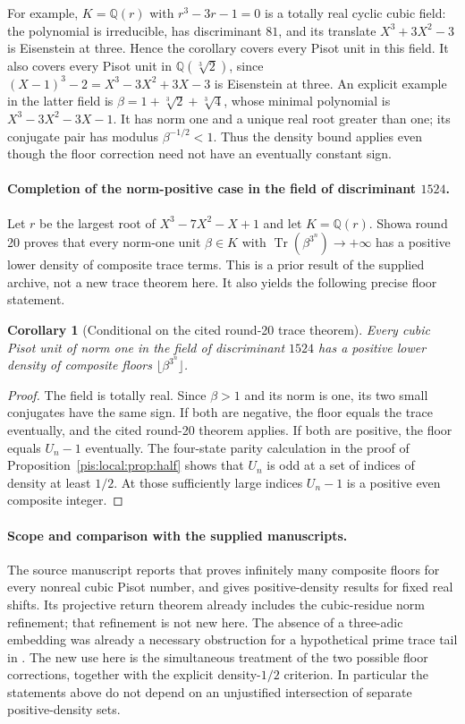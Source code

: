 \documentclass[11pt,a4paper]{article}
\newtheorem{corollary}[theorem]{Corollary}
\theoremstyle{definition}\newtheorem{definition}[theorem]{Definition}
\theoremstyle{remark}\newtheorem{remark}[theorem]{Remark}
\begin{document}
For example, $K=\mathbb Q(r)$ with $r^3-3r-1=0$ is a totally
real cyclic cubic field: the polynomial is irreducible, has
discriminant $81$, and its translate
$X^3+3X^2-3$ is Eisenstein at three. Hence the corollary covers
every Pisot unit in this field. It also covers every Pisot unit in
$\mathbb Q(\sqrt[3]{2})$, since
$(X-1)^3-2=X^3-3X^2+3X-3$ is Eisenstein at three.
An explicit example in the latter field is
$\beta=1+\sqrt[3]{2}+\sqrt[3]{4}$, whose minimal polynomial is
$X^3-3X^2-3X-1$. It has norm one and a unique real root greater
than one; its conjugate pair has modulus $\beta^{-1/2}<1$.
Thus the density bound applies even though the floor correction
need not have an eventually constant sign.

\paragraph{Completion of the norm-positive case in the field of
discriminant $1524$.}
Let $r$ be the largest root of $X^3-7X^2-X+1$ and let
$K=\mathbb Q(r)$. Showa round 20 proves that every norm-one unit
$\beta\in K$ with $\operatorname{Tr}(\beta^{3^n})\to+\infty$
has a positive lower density of composite trace terms. This is a
prior result of the supplied archive, not a new trace theorem here.
It also yields the following precise floor statement.

\begin{corollary}[Conditional on the cited round-20 trace theorem]
\label{pis:local:cor:1524}
Every cubic Pisot unit of norm one in the field of discriminant
$1524$ has a positive lower density of composite floors
$\lfloor\beta^{3^n}\rfloor$.
\end{corollary}
\begin{proof}
The field is totally real. Since $\beta>1$ and its norm is one,
its two small conjugates have the same sign. If both are negative,
the floor equals the trace eventually, and the cited round-20
theorem applies. If both are positive, the floor equals $U_n-1$
eventually. The four-state parity calculation in the proof of
Proposition~\ref{pis:local:prop:half} shows that $U_n$ is odd at a
set of indices of density at least $1/2$. At those sufficiently
large indices $U_n-1$ is a positive even composite integer.
\end{proof}

\paragraph{Scope and comparison with the supplied manuscripts.}
The source manuscript reports that \cite{Keio009} proves infinitely many
composite floors for every nonreal cubic Pisot number, and gives
positive-density results for fixed real shifts. Its projective
return theorem already includes the cubic-residue norm refinement;
that refinement is not new here. The absence of a three-adic
embedding was already a necessary obstruction for a hypothetical
prime trace tail in \cite{Keio031}. The new use here is the
simultaneous treatment of the two possible floor corrections,
together with the explicit density-$1/2$ criterion. In particular
the statements above do not depend on an unjustified intersection
of separate positive-density sets.
\end{document}
